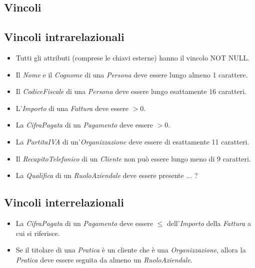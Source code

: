 \documentclass[a4paper,12pt]{article}
\begin{document}
 \subsection{ Vincoli }

\subsection{ Vincoli intrarelazionali }

\begin{itemize}
\item Tutti gli attributi (comprese le chiavi esterne) hanno il vincolo NOT NULL.

\item Il \textit{Nome} e il \textit{Cognome} di una \textit{Persona} deve essere lungo almeno 1 carattere.

\item Il \textit{CodiceFiscale} di una \textit{Persona} deve essere lungo esattamente 16 caratteri.

\item L'\textit{Importo} di una \textit{Fattura} deve essere $> 0$.

\item La \textit{CifraPagata} di un \textit{Pagamento} deve essere $> 0$.

\item La \textit{PartitaIVA} di un'\textit{Organizzazione} deve essere di esattamente 11 caratteri.

\item Il \textit{RecapitoTelefonico} di un \textit{Cliente} non può essere lungo meno di 9 caratteri.

\item La \textit{Qualifica} di un \textit{RuoloAziendale} deve essere presente ... ?
\end{itemize}

\subsection{ Vincoli interrelazionali }

\begin{itemize}
\item La \textit{CifraPagata} di un \textit{Pagamento} deve essere $\leq$ dell'\textit{Importo} della \textit{Fattura} a cui si riferisce.

\item Se il titolare di una \textit{Pratica} è un cliente che è una \textit{Organizzazione}, allora la \textit{Pratica} deve essere seguita da almeno un \textit{RuoloAziendale}.
\end{itemize}
\end{document}
